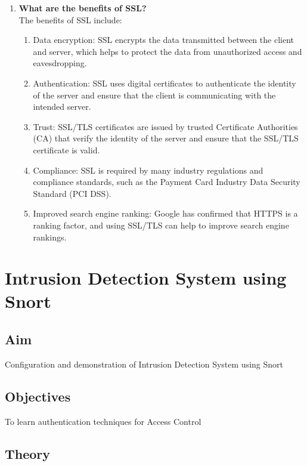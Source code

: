 \documentclass[openany]{book}
\begin{document}
\begin{enumerate}
    \item \textbf{What are the benefits of SSL?}\\

          The benefits of SSL include:

          \begin{enumerate}
              \item Data encryption: SSL encrypts the data transmitted between the client and server, which helps to protect the data from unauthorized access and eavesdropping.
              \item Authentication: SSL uses digital certificates to authenticate the identity of the server and ensure that the client is communicating with the intended server.
              \item Trust: SSL/TLS certificates are issued by trusted Certificate Authorities (CA) that verify the identity of the server and ensure that the SSL/TLS certificate is valid.
              \item Compliance: SSL is required by many industry regulations and compliance standards, such as the Payment Card Industry Data Security Standard (PCI DSS).
              \item Improved search engine ranking: Google has confirmed that HTTPS is a ranking factor, and using SSL/TLS can help to improve search engine rankings.
          \end{enumerate}

\end{enumerate}



\chapter{Intrusion Detection System using Snort}
\section{Aim}
Configuration and demonstration of Intrusion Detection System using Snort

\section{Objectives}
To learn authentication techniques for Access Control


\section{Theory}
\end{document}
